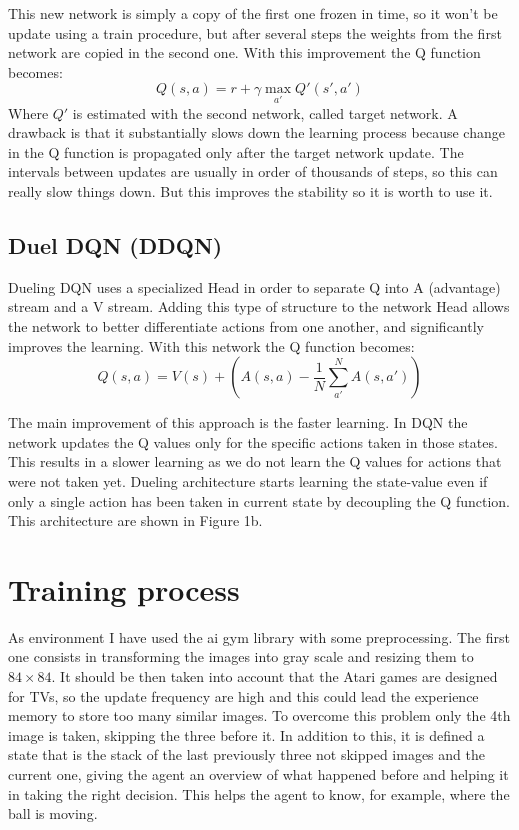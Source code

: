 \documentclass[10pt]{article}
\begin{document}
\begin{multicols}{2}
This new network is simply a copy of the first one frozen in time, so it won't be update using a train procedure, but after several steps the weights from the first network are copied in the second one. With this improvement the Q function becomes: 
\[
Q(s, a) = r + \gamma \max_{a'} Q'(s', a') 
\]
Where $Q'$ is estimated with the second network, called target network.
A drawback is that it substantially slows down the learning process because change in the Q function is propagated only after the target network update. The intervals between updates are usually in order of thousands of steps, so this can really slow things down. But this improves the stability so it is worth to use it.

\subsection{Duel DQN (DDQN)}
Dueling DQN uses a specialized Head in order to separate Q into A (advantage) stream and a V stream. Adding this type of structure to the network Head allows the network to better differentiate actions from one another, and significantly improves the learning. With this network the Q function becomes: 
\[
Q(s, a) = V(s) + (A(s, a) - \frac{1}{N} \sum_{a'}^{N} A(s, a'))
\]

The main improvement of this approach is the faster learning. In DQN the network updates the Q values only for the specific actions taken in those states. This results in a slower learning as we do not learn the Q values for actions that were not taken yet. Dueling architecture starts learning the state-value even if only a single action has been taken in current state by decoupling the Q function. This architecture are shown in Figure 1b. 

\section{Training process}

As environment I have used the ai gym library with some preprocessing. The first one consists in transforming the images into gray scale and resizing them to $84\times84$. It should be then taken into account that the Atari games are designed for TVs, so the update frequency are high and this could lead the experience memory to store too many similar images. To overcome this problem only the 4th image is taken, skipping the three before it. In addition to this, it is defined a state that is the stack of the last previously three not skipped images and the current one, giving the agent an overview of what happened before and helping it in taking the right decision. This helps the agent to know, for example, where the ball is moving.


\end{multicols}
\end{document}
